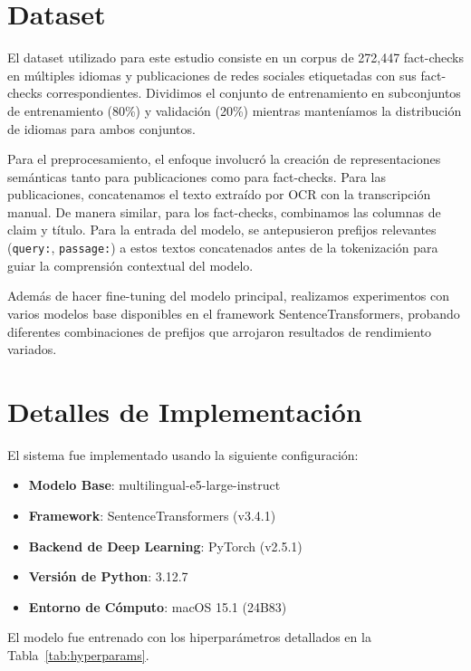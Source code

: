 \documentclass[a4paper,openany]{memoir}
\begin{document}
\section{Dataset}

El dataset utilizado para este estudio consiste en un corpus de 272,447 fact-checks en múltiples idiomas y publicaciones de redes sociales etiquetadas con sus fact-checks correspondientes. Dividimos el conjunto de entrenamiento en subconjuntos de entrenamiento (80\%) y validación (20\%) mientras manteníamos la distribución de idiomas para ambos conjuntos.

Para el preprocesamiento, el enfoque involucró la creación de representaciones semánticas tanto para publicaciones como para fact-checks. Para las publicaciones, concatenamos el texto extraído por OCR con la transcripción manual. De manera similar, para los fact-checks, combinamos las columnas de claim y título. Para la entrada del modelo, se antepusieron prefijos relevantes (\texttt{query:}, \texttt{passage:}) a estos textos concatenados antes de la tokenización para guiar la comprensión contextual del modelo.

Además de hacer fine-tuning del modelo principal, realizamos experimentos con varios modelos base disponibles en el framework SentenceTransformers, probando diferentes combinaciones de prefijos que arrojaron resultados de rendimiento variados.

\section{Detalles de Implementación}

El sistema fue implementado usando la siguiente configuración:

\begin{itemize}
    \item \textbf{Modelo Base}: multilingual-e5-large-instruct
    \item \textbf{Framework}: SentenceTransformers (v3.4.1)
    \item \textbf{Backend de Deep Learning}: PyTorch (v2.5.1)
    \item \textbf{Versión de Python}: 3.12.7
    \item \textbf{Entorno de Cómputo}: macOS 15.1 (24B83)
\end{itemize}

El modelo fue entrenado con los hiperparámetros detallados en la Tabla~\ref{tab:hyperparams}.
\end{document}
